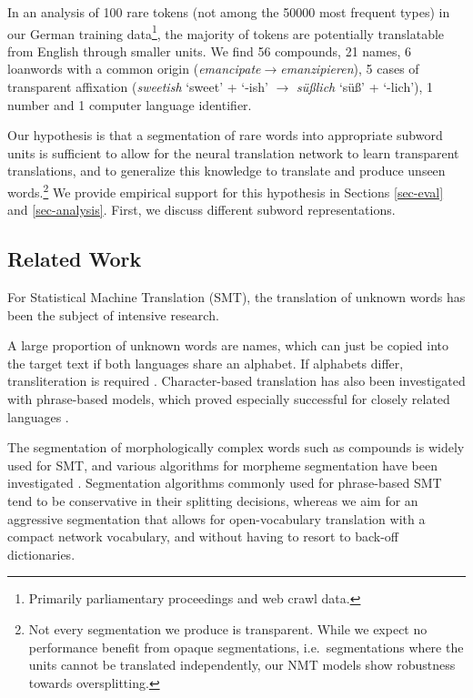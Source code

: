 \documentclass[11pt]{article}
\begin{document}
In an analysis of 100 rare tokens (not among the \num{50000} most frequent types) in our German training data\footnote{Primarily parliamentary proceedings and web crawl data.}, the majority of tokens are potentially translatable from English through smaller units.
We find 56 compounds, 21 names, 6 loanwords with a common origin (\emph{emancipate}$\to$\emph{emanzipieren}),
5 cases of transparent affixation (\emph{sweetish} `sweet' + `-ish' $\to$ \emph{süßlich} `süß' + `-lich'), 1 number and 1 computer language identifier.

Our hypothesis is that a segmentation of rare words into appropriate subword units is sufficient to allow for the neural translation network to learn transparent translations, and to generalize this knowledge to translate and produce unseen words.\footnote{Not every segmentation we produce is transparent. While we expect no performance benefit from opaque segmentations, i.e.\ segmentations where the units cannot be translated independently, our NMT models show robustness towards oversplitting.}
We provide empirical support for this hypothesis in Sections \ref{sec-eval} and \ref{sec-analysis}.
First, we discuss different subword representations.

\subsection{Related Work}
\label{related-sec}

For Statistical Machine Translation (SMT), the translation of unknown words has been the subject of intensive research.

A large proportion of unknown words are names, which can just be copied into the target text if both languages share an alphabet.
If alphabets differ, transliteration is required \cite{DBLP:conf/eacl/DurraniSHK14}.
Character-based translation has also been investigated with phrase-based models, which proved especially successful for closely related languages \cite{vilar-peter-ney:2007:WMT,Tiedemann474916,DBLP:conf/acl/NeubigWMK12}.

The segmentation of morphologically complex words such as compounds is widely used for SMT, and various algorithms for morpheme segmentation have been investigated \cite{Niessen00improvingsmt,koehn03b,virpioja07mtsummit,DBLP:conf/acl/StallardDKLB12}.
Segmentation algorithms commonly used for phrase-based SMT tend to be conservative in their splitting decisions,
whereas we aim for an aggressive segmentation that allows for open-vocabulary translation with a compact network vocabulary, and without having to resort to back-off dictionaries.
\end{document}
